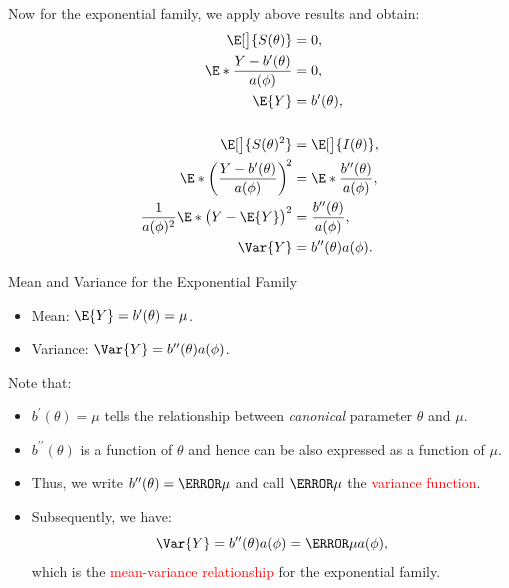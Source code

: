 \documentclass[final]{article}\usepackage[]{graphicx}\usepackage[svgnames]{xcolor}
\begin{document}
Now for the exponential family, we apply above results and obtain:
\begin{align*}
    \E[\big]{S(\theta)}                                          & =0,                                             \\
    \E*{\frac{Y-b^{\prime}(\theta)}{a(\phi)}}                    & =0,                                             \\
    \E{Y}                                                        & =b^\prime(\theta),                              \\\\
    \E[\big]{S(\theta)^2}                                        & =\E[\big]{I(\theta)},                           \\
    \E*{\biggl(\frac{Y-b^\prime(\theta)}{a(\phi)} \biggr)^{\!2}} & =\E*{\frac{b^{\prime\prime}(\theta)}{a(\phi)}}, \\
    \frac{1}{a(\phi)^2}\E*{\bigl(Y-\E{Y}\bigr)^2}                & =\frac{b^{\prime\prime}(\theta)}{a(\phi)},      \\
    \Var{Y}                                                      & =b^{\prime\prime}(\theta)a(\phi).
\end{align*}
\begin{Regular}{Mean and Variance for the Exponential Family}
    \begin{itemize}
        \item Mean: $ \E{Y}=b^\prime(\theta)=\mu $.
        \item Variance: $ \Var{Y}=b^{\prime\prime}(\theta)a(\phi) $.
    \end{itemize}
\end{Regular}
Note that:
\begin{itemize}
    \item $ b^\prime(\theta)=\mu $ tells the relationship between \emph{canonical} parameter $ \theta $ and $ \mu $.
    \item $ b^{\prime\prime}(\theta) $ is a function of $ \theta $ and hence can be also expressed as a function of $ \mu $.
    \item Thus, we write $ b^{\prime\prime}(\theta)=\V{\mu} $ and call $ \V{\mu} $ the \textcolor{Red}{variance function}.
    \item Subsequently, we have:
          \[ \Var{Y}=b^{\prime\prime}(\theta)a(\phi)=\V{\mu}a(\phi), \]
          which is the \textcolor{Red}{mean-variance relationship} for the exponential family.
\end{itemize}
\end{document}
